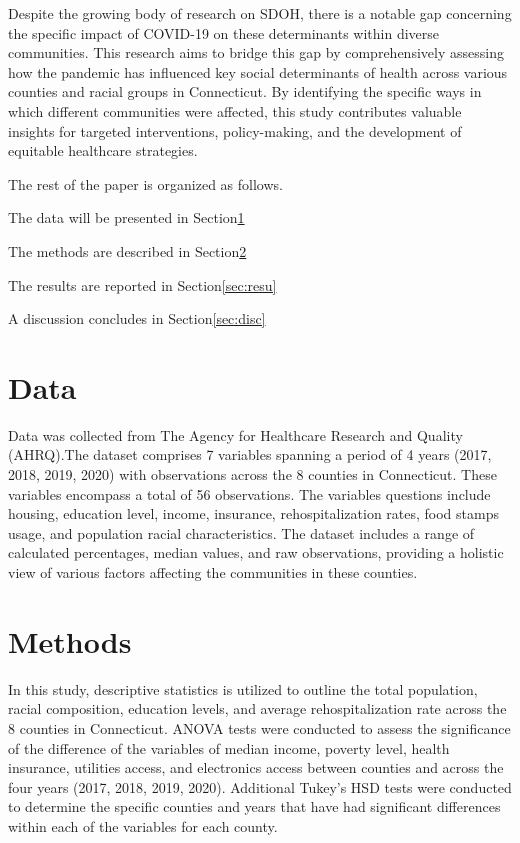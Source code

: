 \documentclass[12pt]{article}
\begin{document}
Despite the growing body of research on SDOH, there is a notable gap concerning the specific impact of COVID-19 on 
these determinants within diverse communities. This research aims to bridge this gap by comprehensively assessing how 
the pandemic has influenced key social determinants of health across various counties and racial groups in Connecticut. 
By identifying the specific ways in which different communities were affected, this study contributes valuable insights 
for targeted interventions, policy-making, and the development of equitable healthcare strategies.


The rest of the paper is organized as follows.

The data will be presented in Section\ref{sec:data}

The methods are described in Section\ref{sec:meth}

The results are reported in Section\ref{sec:resu}

A discussion concludes in Section\ref{sec:disc}

\section{Data}\label{sec:data}

Data was collected from The Agency for Healthcare Research and Quality (AHRQ).The dataset comprises 7 variables 
spanning a period of 4 years (2017, 2018, 2019, 2020) with observations across the 8 counties in Connecticut. These variables 
encompass a total of 56 observations. The variables questions include housing, education level, income, insurance,
rehospitalization rates, food stamps usage, and population racial characteristics. The dataset includes a range of 
calculated percentages, median values, and raw observations, providing a holistic view of various factors affecting 
the communities in these counties. 

\section{Methods}\label{sec:meth}

In this study, descriptive statistics is utilized to outline the total population, racial composition, 
education levels, and average rehospitalization rate across the 8 counties in Connecticut. ANOVA tests were 
conducted to assess the significance of the difference of the variables of median income, poverty level, health insurance, 
utilities access, and electronics access between counties and across the four years (2017, 2018, 2019, 2020). Additional 
Tukey's HSD tests were conducted to determine the specific counties and years that have had significant differences within 
each of the variables for each county.
\end{document}
